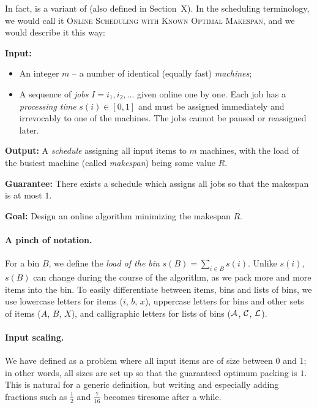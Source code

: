 In fact, \binstretch is a variant of \scheduling (also defined in
Section~X). In the scheduling terminology, we would call it
\textsc{Online Scheduling with Known Optimal Makespan}, and we would
describe it this way:

 \noindent
\textbf{Input:}

\begin{itemize}
\item An integer $m$ -- a number of identical (equally fast) \emph{machines};
\item A sequence of \emph{jobs} $I=i_1, i_2, \ldots$ given online one by one. Each job has
a \textit{processing time} $s(i) \in [0,1]$ and must be assigned immediately and irrevocably
to one of the machines. The jobs cannot be paused or reassigned later.
\end{itemize}

\noindent
\textbf{Output:} A \emph{schedule} assigning all input items to $m$ machines, with the
load of the busiest machine (called \emph{makespan}) being some value
$R$.

\noindent
\textbf{Guarantee:} There exists a schedule which assigns all jobs so that
the makespan is at most $1$.

\noindent
\textbf{Goal:} Design an online algorithm minimizing the makespan $R$.
\smallskip


\paragraph{A pinch of notation.} For a bin $B$, we define the
\textit{load of the bin} $s(B) = \sum_{i \in B} s(i)$. Unlike
$s(i)$, $s(B)$ can change during the course of the algorithm, as we
pack more and more items into the bin. To easily differentiate between
items, bins and lists of bins, we use lowercase letters for items
($i$, $b$, $x$), uppercase letters for bins and other sets of items
($A$, $B$, $X$), and calligraphic letters for lists of bins (${\mathcal A}$,
${\mathcal C}$, ${\mathcal L}$).

\paragraph{Input scaling.} We have defined \binstretch as a problem
where all input items are of size between $0$ and $1$; in other words,
all sizes are set up so that the guaranteed optimum packing is $1$.
This is natural for a generic definition, but writing and especially
adding fractions such as $\frac{1}{2}$ and $\frac{7}{16}$ becomes
tiresome after a while.

